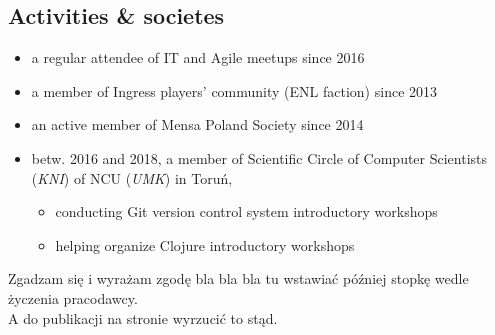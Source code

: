 \documentclass[a4paper]{res}
\begin{document}
\begin{resume}
    \section{Activities \& societes}
        \vspace{0.14in}
    \begin{itemize}
        \item a regular attendee of IT and Agile meetups since 2016
        \vspace{-0.03in}
        \item a member of Ingress players' community (ENL faction) since 2013
        \vspace{-0.03in}
        \item an active member of Mensa Poland Society since 2014
        \vspace{-0.01in}
        \item \footnotesize betw. 2016 and 2018, a member of {Scientific Circle of Computer Scientists (\textsl{KNI})
        of NCU (\textsl{UMK}) in Toruń},
        \vspace{-0.04in}
        \begin{itemize}
        \vspace{-0.01in}
            \item conducting Git version control system introductory workshops
        \vspace{-0.03in}
            \item helping organize Clojure introductory workshops
        \end{itemize}
    \end{itemize}
\end{resume}
\vspace{-0.15in}
\begin{center}
    \noindent\makebox[\dimexpr\linewidth]{\rule{\dimexpr\paperwidth-3in}{0.4pt}}
    \footnotesize
    Zgadzam się i wyrażam zgodę bla bla bla tu wstawiać później stopkę wedle życzenia pracodawcy.\\
    A do publikacji na stronie wyrzucić to stąd.
\end{center}
\end{document}
